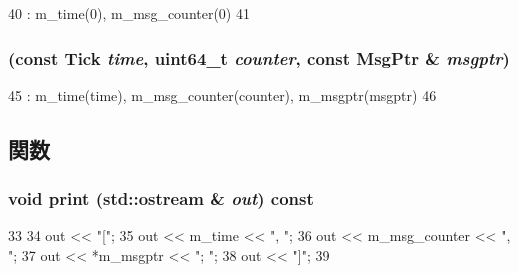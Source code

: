 \begin{DoxyCode}
40         : m_time(0), m_msg_counter(0)
41     {}
\end{DoxyCode}
\hypertarget{classMessageBufferNode_a4656246025c0312a0be18a81a5ebaeb7}{
\subsubsection[{MessageBufferNode}]{ (const {\bf Tick} {\em time}, \/  uint64\_\-t {\em counter}, \/  const {\bf MsgPtr} \& {\em msgptr})}}
\label{classMessageBufferNode_a4656246025c0312a0be18a81a5ebaeb7}



\begin{DoxyCode}
45         : m_time(time), m_msg_counter(counter), m_msgptr(msgptr)
46     {}
\end{DoxyCode}


\subsection{関数}
\hypertarget{classMessageBufferNode_ac55fe386a101fbae38c716067c9966a0}{
\subsubsection[{print}]{\setlength{\rightskip}{0pt plus 5cm}void print (std::ostream \& {\em out}) const}}
\label{classMessageBufferNode_ac55fe386a101fbae38c716067c9966a0}



\begin{DoxyCode}
33 {
34     out << "[";
35     out << m_time << ", ";
36     out << m_msg_counter << ", ";
37     out << *m_msgptr << "; ";
38     out << "]";
39 }
\end{DoxyCode}


